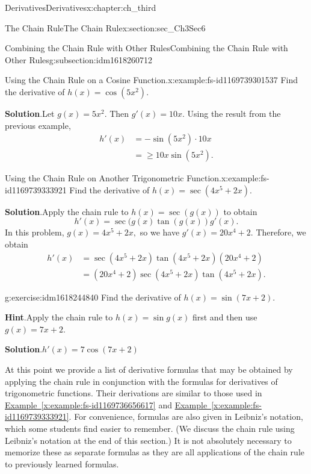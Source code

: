 \documentclass[oneside,10pt,]{book}
\newcommand{\blocktitlefont}{\relax}
\newcommand{\xreffont}{\relax}
\numberwithin{equation}{section}
\newcommand{\amp}{&}
\begin{document}
\begin{chapterptx}{Derivatives}{}{Derivatives}{}{}{x:chapter:ch_third}
\begin{sectionptx}{The Chain Rule}{}{The Chain Rule}{}{}{x:section:sec_Ch3Sec6}
\begin{subsectionptx}{Combining the Chain Rule with Other Rules}{}{Combining the Chain Rule with Other Rules}{}{}{g:subsection:idm1618260712}
\begin{example}{Using the Chain Rule on a Cosine Function.}{x:example:fs-id1169739301537}%
Find the derivative of \(h(x)=\cos (5x^2).\)%
\par\smallskip%
\noindent\textbf{\blocktitlefont Solution}.\hypertarget{g:solution:idm1618253544}{}\quad{}Let \(g(x)=5x^2.\) Then \(g'(x)=10x.\) Using the result from the previous example,%
%
\begin{align*}
h'(x)\amp=-\sin (5x^2)\cdot 10x\\
\amp=\geq 10x \sin (5x^2).
\end{align*}
\end{example}
\begin{example}{Using the Chain Rule on Another Trigonometric Function.}{x:example:fs-id1169739333921}%
Find the derivative of \(h(x)=\sec (4x^5+2x).\)%
\par\smallskip%
\noindent\textbf{\blocktitlefont Solution}.\hypertarget{g:solution:idm1618250088}{}\quad{}Apply the chain rule to \(h(x)=\sec(g(x))\) to obtain%
%
\begin{equation*}
h'(x)=\sec(g(x)\tan (g(x))g'(x).
\end{equation*}
In this problem, \(g(x)=4x^5+2x,\) so we have \(g'(x)=20x^4+2.\) Therefore, we obtain%
%
\begin{align*}
h'(x)\amp=\sec (4x^5+2x) \tan (4x^5+2x)(20x^4+2)\\
\amp=(20x^4+2)\sec (4x^5+2x) \tan (4x^5+2x).
\end{align*}
\end{example}
\begin{inlineexercise}{}{g:exercise:idm1618244840}%
Find the derivative of \(h(x)=\sin(7x+2).\)%
\par\smallskip%
\noindent\textbf{\blocktitlefont Hint}.\hypertarget{g:hint:idm1618243560}{}\quad{}Apply the chain rule to \(h(x)=\sin g(x)\) first and then use \(g(x)=7x+2.\)%
\par\smallskip%
\noindent\textbf{\blocktitlefont Solution}.\hypertarget{g:solution:idm1618238440}{}\quad{}\(h'(x)=7 \cos (7x+2)\)%
\end{inlineexercise}%
At this point we provide a list of derivative formulas that may be obtained by applying the chain rule in conjunction with the formulas for derivatives of trigonometric functions. Their derivations are similar to those used in \hyperref[x:example:fs-id1169736656617]{Example~{\xreffont\ref{x:example:fs-id1169736656617}}} and \hyperref[x:example:fs-id1169739333921]{Example~{\xreffont\ref{x:example:fs-id1169739333921}}}. For convenience, formulas are also given in Leibniz’s notation, which some students find easier to remember. (We discuss the chain rule using Leibniz’s notation at the end of this section.) It is not absolutely necessary to memorize these as separate formulas as they are all applications of the chain rule to previously learned formulas.%

\end{subsectionptx}
\end{sectionptx}
\end{chapterptx}
\end{document}
